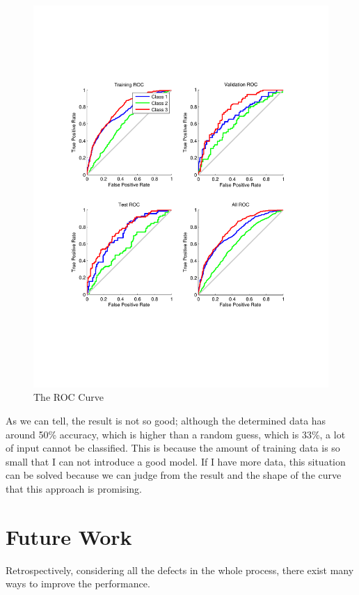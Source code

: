 \documentclass{sig-alternate}
\begin{document}
\begin{figure}[ht]
\centering
\includegraphics[scale = 0.5, trim = 300 150 300 150]{pic/cl2.pdf}
\caption{The ROC Curve}
\end{figure}

As we can tell, the result is not so good; although the determined data has around 50\% accuracy, which is higher than a random guess, which is 33\%, a lot of input cannot be classified. This is because the amount of training data is so small that I can not introduce a good model. If I have more data, this situation can be solved because we can judge from the result and the shape of the curve that this approach is promising.

\section{Future Work}


Retrospectively, considering all the defects in the whole process, there exist many ways to improve the performance.
\end{document}
